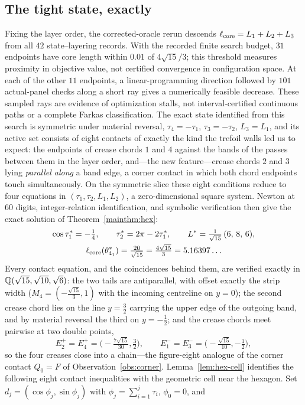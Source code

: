 \subsection{The tight state, exactly}
Fixing the layer order, the corrected-oracle rerun descends $\ell_{\mathrm{core}}=L_1+L_2+L_3$ from all $42$ state--layering records. With the recorded finite search budget, $31$ endpoints have core length within $0.01$ of $4\sqrt{15}/3$; this threshold measures proximity in objective value, not certified convergence in configuration space. At each of the other $11$ endpoints, a linear-programming direction followed by $101$ actual-panel checks along a short ray gives a numerically feasible decrease. These sampled rays are evidence of optimization stalls, not interval-certified continuous paths or a complete Farkas classification. The exact state identified from this search is symmetric under material reversal, $\tau_4=-\tau_1$, $\tau_3=-\tau_2$, $L_3=L_1$, and its active set consists of eight contacts of exactly the kind the trefoil walls led us to expect: the endpoints of crease chords $1$ and $4$ against the bands of the passes between them in the layer order, and---the new feature---crease chords $2$ and $3$ lying \emph{parallel along} a band edge, a corner contact in which both chord endpoints touch simultaneously. On the symmetric slice these eight conditions reduce to four equations in $(\tau_1,\tau_2,L_1,L_2)$, a zero-dimensional square system. Newton at $60$ digits, integer-relation identification, and symbolic verification then give the exact solution of Theorem~\ref{mainthm:hex}:
\begin{gather*}
\cos\tau_1^*=-\tfrac14,\qquad \tau_2^*=2\pi-2\tau_1^*,\qquad
L^*=\tfrac{1}{\sqrt{15}}\,(6,\,8,\,6),\\
\ell_{\mathrm{core}}(\theta^*_{4_1})=\tfrac{20}{\sqrt{15}}=\tfrac{4\sqrt{15}}{3}=5.16397\ldots
\end{gather*}
Every contact equation, and the coincidences behind them, are verified exactly in $\mathbb{Q}(\sqrt{15},\sqrt{10},\sqrt6)$: the two tails are antiparallel, with offset exactly the strip width ($M_4=({-}\tfrac{\sqrt{15}}3,1)$ with the incoming centreline on $y=0$); the second crease chord lies on the line $y=\tfrac32$ carrying the upper edge of the outgoing band, and by material reversal the third on $y=-\tfrac12$; and the crease chords meet pairwise at two double points,
\[
E_2^+=E_4^+=\big({-}\tfrac{7\sqrt{15}}{30},\tfrac32\big),\qquad
E_1^-=E_3^-=\big({-}\tfrac{\sqrt{15}}{10},-\tfrac12\big),
\]
so the four creases close into a chain---the figure-eight analogue of the corner contact $Q_0=F$ of Observation~\ref{obs:corner}. Lemma~\ref{lem:hex-cell} identifies the following eight contact inequalities with the geometric cell near the hexagon. Set $d_j=(\cos\phi_j,\sin\phi_j)$ with $\phi_j=\sum_{i=1}^j\tau_i$, $\phi_0=0$, and
